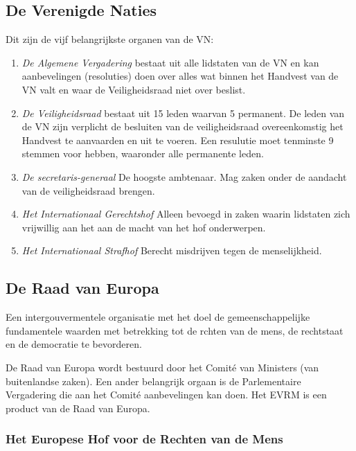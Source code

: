 \documentclass{article}
\begin{document}
\subsection{De Verenigde Naties}

Dit zijn de vijf belangrijkste organen van de VN:

\begin{enumerate}

  \item \emph{De Algemene Vergadering} bestaat uit alle lidstaten van de VN en
    kan aanbevelingen (resoluties) doen over alles wat binnen het Handvest van
    de VN valt en waar de Veiligheidsraad niet over beslist.

  \item \emph{De Veiligheidsraad} bestaat uit 15 leden waarvan 5 permanent. De
    leden van de VN zijn verplicht de besluiten van de veiligheidsraad
    overeenkomstig het Handvest te aanvaarden en uit te voeren. Een resulutie
    moet tenminste 9 stemmen voor hebben, waaronder alle permanente leden.

  \item \emph{De secretaris-generaal} De hoogste ambtenaar. Mag zaken onder de
    aandacht van de veiligheidsraad brengen.

  \item \emph{Het Internationaal Gerechtshof} Alleen bevoegd in zaken waarin
    lidstaten zich vrijwillig aan het aan de macht van het hof onderwerpen.

  \item \emph{Het Internationaal Strafhof} Berecht misdrijven tegen de
    menselijkheid.
\end{enumerate}

\subsection{De Raad van Europa}

Een intergouvermentele organisatie met het doel de gemeenschappelijke
fundamentele waarden met betrekking tot de rchten van de mens, de rechtstaat en
de democratie te bevorderen.

De Raad van Europa wordt bestuurd door het Comit\'e van Ministers (van
buitenlandse zaken). Een ander belangrijk orgaan is de Parlementaire
Vergadering die aan het Comit\'e aanbevelingen kan doen. Het EVRM is een
product van de Raad van Europa.

\subsubsection{Het Europese Hof voor de Rechten van de Mens}
\end{document}
